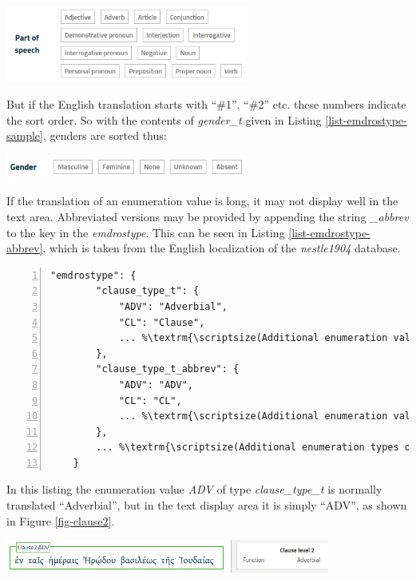 \documentclass[11pt,oneside,a4paper]{memoir}
\begin{document}
\begin{center}
  \includegraphics[width=0.6\textwidth]{psp.png}
\end{center}

But if the English translation starts with ``\#1'', ``\#2'' etc. these numbers indicate the sort
order. So with the contents of \emph{gender\_t} given in Listing \ref{list-emdrostype-sample},
genders are sorted thus:

\begin{center}
  \includegraphics[width=0.6\textwidth]{gender2.png}
\end{center}


If the translation of an enumeration value is long, it may not display well in the text area.
Abbreviated versions may be provided by appending the string \emph{\_abbrev} to the key in the
\emph{emdrostype}. This can be seen in Listing \ref{list-emdrostype-abbrev}, which is taken from
the English localization of the \emph{nestle1904} database.

\begin{lstlisting}[numbers=left,caption=Abbreviated emdrostype values,label=list-emdrostype-abbrev]
    "emdrostype": {
        "clause_type_t": {
            "ADV": "Adverbial",
            "CL": "Clause",
            ... %\textrm{\scriptsize(Additional enumeration values omitted)}%
        },
        "clause_type_t_abbrev": {
            "ADV": "ADV",
            "CL": "CL",
            ... %\textrm{\scriptsize(Additional enumeration values omitted)}%
        },
        ... %\textrm{\scriptsize(Additional enumeration types omitted)}%
    }
\end{lstlisting}

In this listing the enumeration value \emph{ADV} of type \emph{clause\_type\_t} is normally translated ``Adverbial'', but in
the text display area it is simply ``ADV'', as shown in Figure \ref{fig-clause2}.

\begin{center}
  \parbox{0.8\textwidth}{
    \includegraphics[width=0.8\textwidth]{clause2.png}  %
    \label{fig-clause2}
  }
\end{center}
\end{document}
